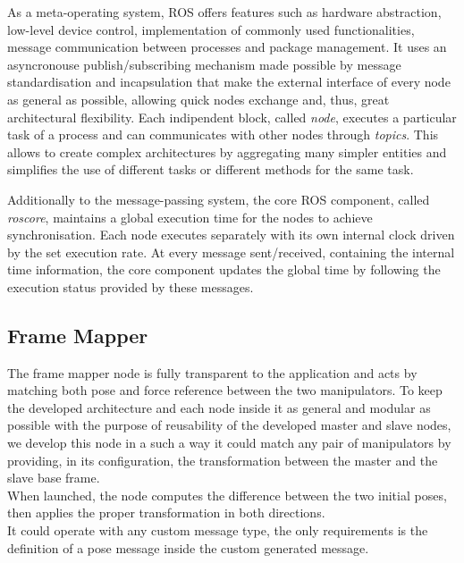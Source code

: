 As a meta-operating system, ROS offers features such as hardware abstraction, low-level device
control, implementation of commonly used functionalities, message communication between processes and package management.
It uses an asyncronouse publish/subscribing mechanism  made possible by
message standardisation and incapsulation that make the external interface
of every node as general as possible, allowing quick nodes exchange and, thus,
great architectural flexibility.
Each indipendent block, called \textit{node}, executes a particular task of a process and can communicates with other nodes through \textit{topics}.
This allows to create complex architectures by aggregating many simpler entities and simplifies the use of different tasks  or different methods for the same task.

Additionally to the message-passing system, the core ROS component,
called \textit{roscore}, maintains a global execution time for the nodes to achieve
synchronisation. Each node executes separately with its own internal clock
driven by the set execution rate. At every message sent/received, containing
the internal time information, the core component updates the global time by
following the execution status provided by these messages.


\subsection{Frame Mapper}
The frame mapper node is fully transparent to the application and acts by matching both pose and force reference between the two manipulators.
To keep the developed architecture and each node inside it as general and modular as possible with the purpose of reusability of the developed master and slave nodes, we develop this node in a such a way it could match any pair of manipulators by providing, in its configuration, the transformation between the master and the slave base frame.\\
When launched, the node computes the difference between the two initial poses, then applies the proper transformation in both directions.\\
It could operate with any custom message type, the only requirements is the definition of a pose message inside the custom generated message.


